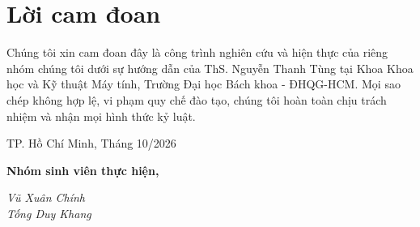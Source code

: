 \newpage

\section*{\Huge Lời cam đoan}

Chúng tôi xin cam đoan đây là công trình nghiên cứu và hiện thực của riêng nhóm chúng tôi dưới sự hướng dẫn của ThS. Nguyễn Thanh Tùng tại Khoa Khoa học và Kỹ thuật Máy tính, Trường Đại học Bách khoa - ĐHQG-HCM. Mọi sao chép không hợp lệ, vi phạm quy chế đào tạo, chúng tôi hoàn toàn chịu trách nhiệm và nhận mọi hình thức kỷ luật.
\newline

\begin{flushright}
\begin{minipage}[t]{0.48\textwidth}
\begin{center}
    TP. Hồ Chí Minh, Tháng 10/2026
    
    \textbf{Nhóm sinh viên thực hiện,}

    \textit{Vũ Xuân Chính} \\
    \textit{Tống Duy Khang}
\end{center}
\end{minipage}
\end{flushright}
